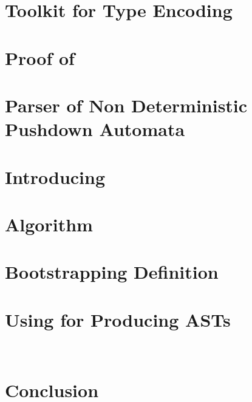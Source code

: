 \documentclass[a4paper,USenglish]{lipics}
\begin{document}
\section{Toolkit for Type Encoding}
\label{Section:toolkit}


\section{Proof of }
\label{Section:proof}


\section{Parser of Non Deterministic Pushdown Automata}
\label{Section:bridge}


\section{Introducing \Self}
\label{Section:fajita}


\section{Algorithm}
\label{Section:algorithm}


\section{Bootstrapping Definition}
\label{Section:bootstrapping}


\section{Using \Self for Producing ASTs}
\label{Section:AST}


\

\section{Conclusion}
\label{Section:zz}


\small
%

\end{document}
